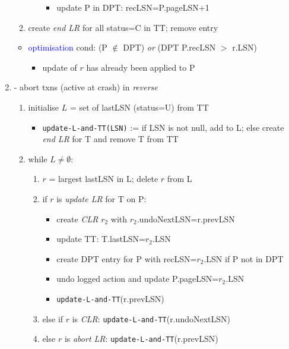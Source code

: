 \documentclass[10pt, landscape]{article}
\begin{document}
\begin{multicols*}{4}
\begin{enumerate}
\begin{enumerate}
\begin{enumerate}
              \begin{itemize}
                \item update P in DPT: recLSN=P.pageLSN+1
              \end{itemize}
          \end{enumerate}
        \item create \textit{end LR} for all status=C in TT; remove entry
      \end{enumerate}
      \begin{itemize}
        \item \textcolor{blue}{optimisation} cond: (P $\not\in$ DPT) \textit{or} (DPT P.recLSN $>$ r.LSN)
          \begin{itemize}
            \item update of $r$ has already been applied to P
          \end{itemize}
      \end{itemize}
    \item {} - abort  txns (active at crash) in \textit{reverse}
      \begin{enumerate}
        \item initialise $L$ = set of lastLSN (status=U) from TT
          \begin{itemize}
            \item \texttt{update-L-and-TT(LSN)} := if LSN is not null, add to L; else create \textit{end LR} for T and remove T from TT
          \end{itemize}
        \item while $L \neq \emptyset$:
          \begin{enumerate}
            \item $r$ = largest lastLSN in L; delete $r$ from L
            \item if $r$ is \textit{update LR} for T on P:
              \begin{itemize}
                \item create \textit{CLR} $r_2$ with $r_2$.undoNextLSN=r.prevLSN
                \item update TT: T.lastLSN=$r_2$.LSN
                \item create DPT entry for P with recLSN=$r_2$.LSN if P not in DPT
                \item undo logged action and update P.pageLSN=$r_2$.LSN
                \item \texttt{update-L-and-TT}(r.prevLSN)
              \end{itemize}
            \item else if $r$ is \textit{CLR}: \texttt{update-L-and-TT}(r.undoNextLSN)
            \item else $r$ is \textit{abort LR}: \texttt{update-L-and-TT}(r.prevLSN)
          \end{enumerate}
      \end{enumerate}
  \end{enumerate}


\end{multicols*}
\end{document}
